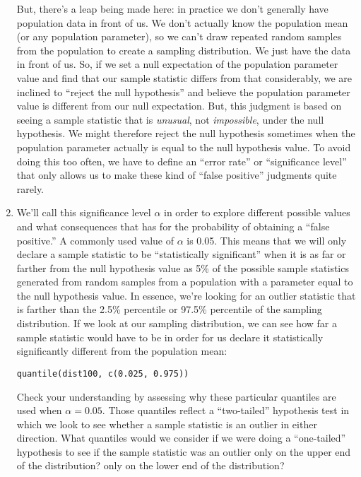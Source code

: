 \documentclass[a4paper,12pt]{article}
\begin{document}
\begin{enumerate}
But, there's a leap being made here: in practice we don't generally have population data in front of us. We don't actually know the population mean (or any population parameter), so we can't draw repeated random samples from the population to create a sampling distribution. We just have the data in front of us. So, if we set a null expectation of the population parameter value and find that our sample statistic differs from that considerably, we are inclined to ``reject the null hypothesis'' and believe the population parameter value is different from our null expectation. But, this judgment is based on seeing a sample statistic that is \textit{unusual}, not \textit{impossible}, under the null hypothesis. We might therefore reject the null hypothesis sometimes when the population parameter actually is equal to the null hypothesis value. To avoid doing this too often, we have to define an ``error rate'' or ``significance level'' that only allows us to make these kind of ``false positive'' judgments quite rarely.

\item We'll call this significance level $\alpha$ in order to explore different possible values and what consequences that has for the probability of obtaining a ``false positive.'' A commonly used value of $\alpha$ is 0.05. This means that we will only declare a sample statistic to be ``statistically significant'' when it is as far or farther from the null hypothesis value as 5\% of the possible sample statistics generated from random samples from a population with a parameter equal to the null hypothesis value. In essence, we're looking for an outlier statistic that is farther than the 2.5\% percentile or 97.5\% percentile of the sampling distribution. If we look at our sampling distribution, we can see how far a sample statistic would have to be in order for us declare it statistically significantly different from the population mean:

\begin{verbatim}
quantile(dist100, c(0.025, 0.975))
\end{verbatim}

\noindent Check your understanding by assessing why these particular quantiles are used when $\alpha = 0.05$. Those quantiles reflect a ``two-tailed'' hypothesis test in which we look to see whether a sample statistic is an outlier in either direction. What quantiles would we consider if we were doing a ``one-tailed'' hypothesis to see if the sample statistic was an outlier only on the upper end of the distribution? only on the lower end of the distribution?


\end{enumerate}
\end{document}
